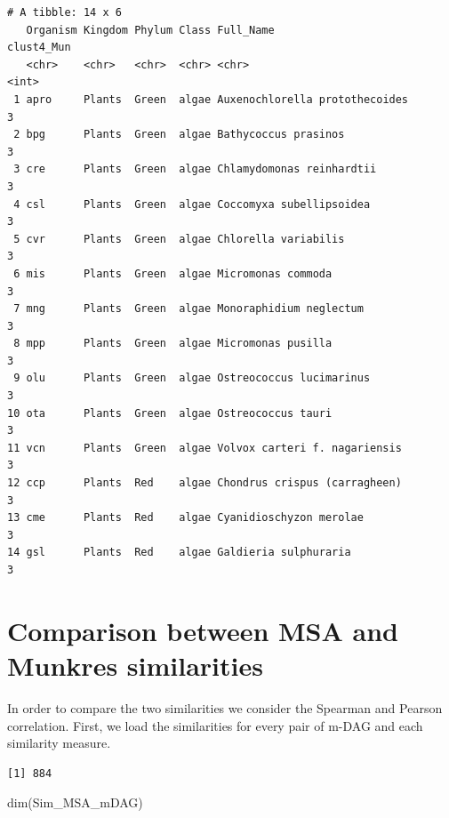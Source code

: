 \documentclass[
  letterpaper,
  DIV=11,
  numbers=noendperiod]{scrreprt}
\newenvironment{Shaded}{}{}
\newcommand{\DecValTok}[1]{\textcolor[rgb]{0.82,0.60,0.40}{#1}}
\newcommand{\FunctionTok}[1]{\textcolor[rgb]{0.38,0.69,0.94}{#1}}
\newcommand{\NormalTok}[1]{\textcolor[rgb]{0.67,0.70,0.75}{#1}}
\newcommand{\OtherTok}[1]{\textcolor[rgb]{0.15,0.68,0.38}{#1}}
\newcommand{\SpecialCharTok}[1]{\textcolor[rgb]{0.34,0.71,0.76}{#1}}
\begin{document}
\begin{verbatim}
# A tibble: 14 x 6
   Organism Kingdom Phylum Class Full_Name                      clust4_Mun
   <chr>    <chr>   <chr>  <chr> <chr>                               <int>
 1 apro     Plants  Green  algae Auxenochlorella protothecoides          3
 2 bpg      Plants  Green  algae Bathycoccus prasinos                    3
 3 cre      Plants  Green  algae Chlamydomonas reinhardtii               3
 4 csl      Plants  Green  algae Coccomyxa subellipsoidea                3
 5 cvr      Plants  Green  algae Chlorella variabilis                    3
 6 mis      Plants  Green  algae Micromonas commoda                      3
 7 mng      Plants  Green  algae Monoraphidium neglectum                 3
 8 mpp      Plants  Green  algae Micromonas pusilla                      3
 9 olu      Plants  Green  algae Ostreococcus lucimarinus                3
10 ota      Plants  Green  algae Ostreococcus tauri                      3
11 vcn      Plants  Green  algae Volvox carteri f. nagariensis           3
12 ccp      Plants  Red    algae Chondrus crispus (carragheen)           3
13 cme      Plants  Red    algae Cyanidioschyzon merolae                 3
14 gsl      Plants  Red    algae Galdieria sulphuraria                   3
\end{verbatim}

\hypertarget{comparison-between-msa-and-munkres-similarities}{%
\section{Comparison between MSA and Munkres
similarities}\label{comparison-between-msa-and-munkres-similarities}}

In order to compare the two similarities we consider the Spearman and
Pearson correlation. First, we load the similarities for every pair of
m-DAG and each similarity measure.

\begin{Shaded}
\end{Shaded}

\begin{verbatim}
[1] 884
\end{verbatim}

\begin{Shaded}
\begin{Highlighting}[]
\FunctionTok{dim}\NormalTok{(Sim\_MSA\_mDAG)}
\end{Highlighting}
\end{Shaded}
\end{document}
